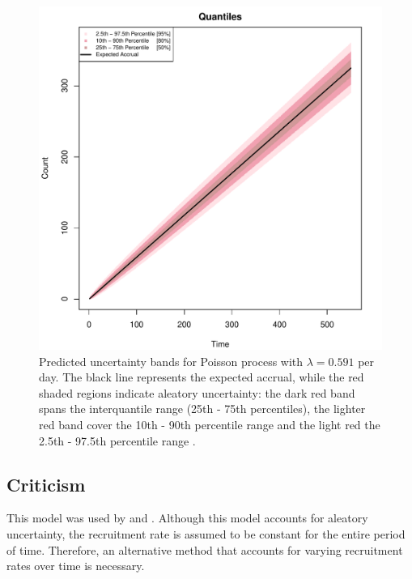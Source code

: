\begin{figure}
\begin{knitrout}
\color{fgcolor}

{\centering \includegraphics[width=\textwidth-3cm]{figure/ch02_figunnamed-chunk-6-1} 

}


\end{knitrout}
  \caption{Predicted uncertainty bands for Poisson process with $\lambda = 0.591$ per day. The black line represents the expected accrual, while the red shaded regions indicate aleatory uncertainty: the dark red band spans the interquantile range (25th - 75th percentiles), the lighter red band cover the 10th - 90th percentile range and the light red the 2.5th - 97.5th percentile range \citep{spiegelhalter2011visualizing}.}
  \label{fig:2_5}
\end{figure}

\subsection{Criticism}

This model was used by \cite{carter2004application} and \cite{carter2005practical}. Although this model accounts for aleatory uncertainty, the recruitment rate is assumed to be constant for the entire period of time. Therefore, an alternative method that accounts for varying recruitment rates over time is necessary.

